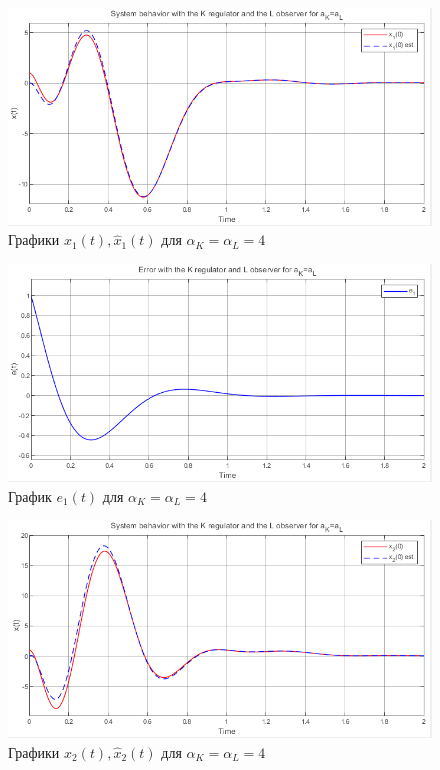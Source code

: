 \documentclass[a4paper, 12pt]{article}
\begin{document}
    
    \newpage
    \vspace*{20mm}
    \begin{figure}[H]
        \centering
        \includegraphics[scale=0.8]{2task_aK=aL_x1.png}
        \captionsetup{skip=0pt}
        \caption{Графики $x_1(t),\hat{x}_1(t)$ для $\alpha_K=\alpha_L=4$}
        \label{2task_aKeqaL_x1}
    \end{figure}
    \begin{figure}[H]
        \centering
        \includegraphics[scale=0.8]{2task_aK=aL_e1.png}
        \captionsetup{skip=0pt}
        \caption{График $e_1(t)$ для $\alpha_K=\alpha_L=4$}
        \label{2task_aKeqaL_e1}
    \end{figure}
    \newpage
    \vspace*{20mm}
    \begin{figure}[H]
        \centering
        \includegraphics[scale=0.8]{2task_aK=aL_x2.png}
        \captionsetup{skip=0pt}
        \caption{Графики $x_2(t),\hat{x}_2(t)$ для $\alpha_K=\alpha_L=4$}
        \label{2task_aKeqaL_x2}
    \end{figure}
\end{document}
